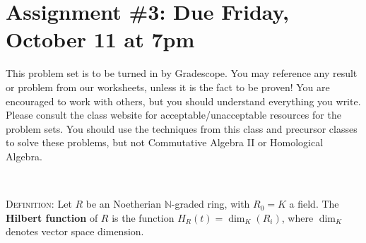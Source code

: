 \documentclass[12pt]{amsart}
\newcommand{\N}{\mathbb{N}}
\newcommand{\showsol}[1]{\def\displaysol{#1}}
\begin{document}
\showsol{1}
	
	\thispagestyle{empty}
	
	\section*{Assignment \#3: Due Friday, October 11 at 7pm}
	
	This problem set is to be turned in by Gradescope. You may reference any result or problem from our worksheets, unless it is the fact to be proven! You are encouraged to work with others, but you should understand everything you write. Please consult the class website for acceptable/unacceptable resources for the problem sets. You should use the techniques from this class and precursor classes to solve these problems, but not Commutative Algebra II or Homological Algebra. 
	
	\
	
\textsc{Definition:} Let $R$ be an Noetherian $\N$-graded ring, with $R_0=K$ a field. The \textbf{Hilbert function} of $R$ is the function $H_R(t) = \dim_{K}(R_i)$, where $\dim_K$ denotes vector space dimension.

\
	
\end{document}

